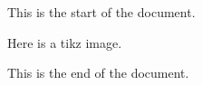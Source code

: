 




    This is the start of the document.

    Here is a tikz image.

    This is the end of the document.

